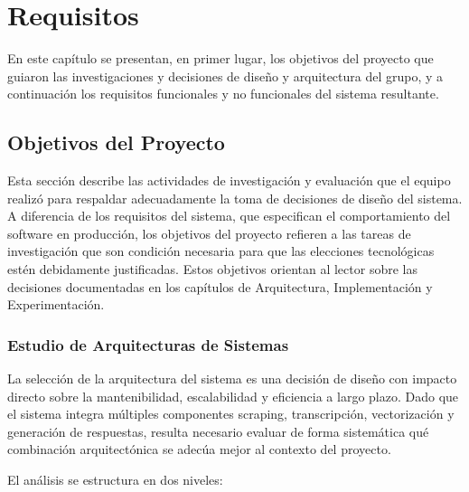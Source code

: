 \chapter{Requisitos}
\label{chapter:3-Requisitos}

En este capítulo se presentan, en primer lugar, los objetivos del proyecto que guiaron las investigaciones y decisiones de diseño y arquitectura del grupo, y a continuación los requisitos funcionales y no funcionales del sistema resultante. 

\section{Objetivos del Proyecto}
\label{section:3-Objetivos del Proyecto}

Esta sección describe las actividades de investigación y evaluación que el equipo realizó para respaldar adecuadamente la toma de decisiones de diseño del sistema. A diferencia de los requisitos del sistema, que especifican el comportamiento del software en producción, los objetivos del proyecto refieren a las tareas de investigación que son condición necesaria para que las elecciones tecnológicas estén debidamente justificadas. Estos objetivos orientan al lector sobre las decisiones documentadas en los capítulos de Arquitectura, Implementación y Experimentación.

\subsection{Estudio de Arquitecturas de Sistemas}
\label{subsection:3-RNF2: Estudio de Arquitecturas de Sistemas}

La selección de la arquitectura del sistema es una decisión de diseño con impacto directo sobre la mantenibilidad, escalabilidad y
eficiencia a largo plazo. Dado que el sistema integra múltiples componentes scraping, transcripción, vectorización y generación de
respuestas, resulta necesario evaluar de forma sistemática qué combinación arquitectónica se adecúa mejor al contexto del proyecto.

El análisis se estructura en dos niveles:

